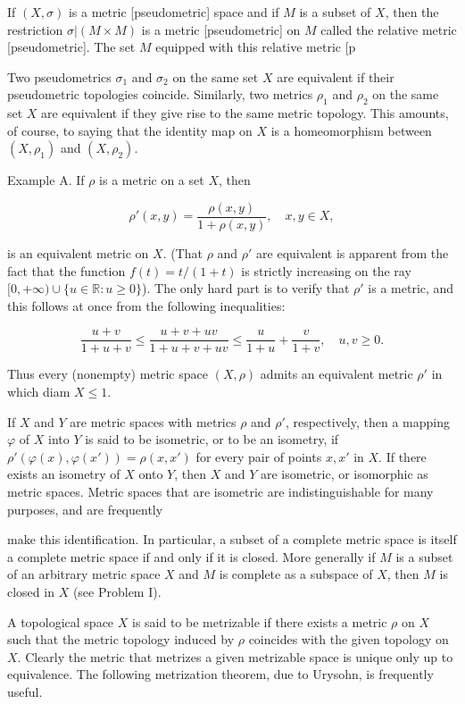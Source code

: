 If $(X, \sigma)$ is a metric [pseudometric] space and if $M$ is a subset of $X$, then the restriction $\sigma|(M \times M)$ is a metric [pseudometric] on $M$ called the relative metric [pseudometric]. The set $M$ equipped with this relative metric [p

Two pseudometrics $\sigma_1$ and $\sigma_2$ on the same set $X$ are equivalent if their pseudometric topologies coincide. Similarly, two metrics $\rho_1$ and $\rho_2$ on the same set $X$ are equivalent if they give rise to the same metric topology. This amounts, of course, to saying that the identity map on $X$ is a homeomorphism between $(X, \rho_1)$ and $(X, \rho_2)$.

Example A. If $\rho$ is a metric on a set $X$, then

$$\rho'(x, y) = \frac{\rho(x, y)}{1 + \rho(x, y)}, \quad x, y \in X,$$

is an equivalent metric on $X$. (That $\rho$ and $\rho'$ are equivalent is apparent from the fact that the function $f(t) = t/(1 + t)$ is strictly increasing on the ray $[0, +\infty) \cup \{u \in \mathbb{R} : u \geq 0\}$). The only hard part is to verify that $\rho'$ is a metric, and this follows at once from the following inequalities:

$$\frac{u + v}{1 + u + v} \leq \frac{u + v + uv}{1 + u + v + uv} \leq \frac{u}{1 + u} + \frac{v}{1 + v}, \quad u, v \geq 0.$$

Thus every (nonempty) metric space $(X, \rho)$ admits an equivalent metric $\rho'$ in which diam $X \leq 1$.

If $X$ and $Y$ are metric spaces with metrics $\rho$ and $\rho'$, respectively, then a mapping $\varphi$ of $X$ into $Y$ is said to be isometric, or to be an isometry, if $\rho'(\varphi(x), \varphi(x')) = \rho(x, x')$ for every pair of points $x, x'$ in $X$. If there exists an isometry of $X$ onto $Y$, then $X$ and $Y$ are isometric, or isomorphic as metric spaces. Metric spaces that are isometric are indistinguishable for many purposes, and are frequently

make this identification. In particular, a subset of a complete metric space is itself a complete metric space if and only if it is closed. More generally if $M$ is a subset of an arbitrary metric space $X$ and $M$ is complete as a subspace of $X$, then $M$ is closed in $X$ (see Problem I).

A topological space $X$ is said to be metrizable if there exists a metric $\rho$ on $X$ such that the metric topology induced by $\rho$ coincides with the given topology on $X$. Clearly the metric that metrizes a given metrizable space is unique only up to equivalence. The following metrization theorem, due to Urysohn, is frequently useful.
